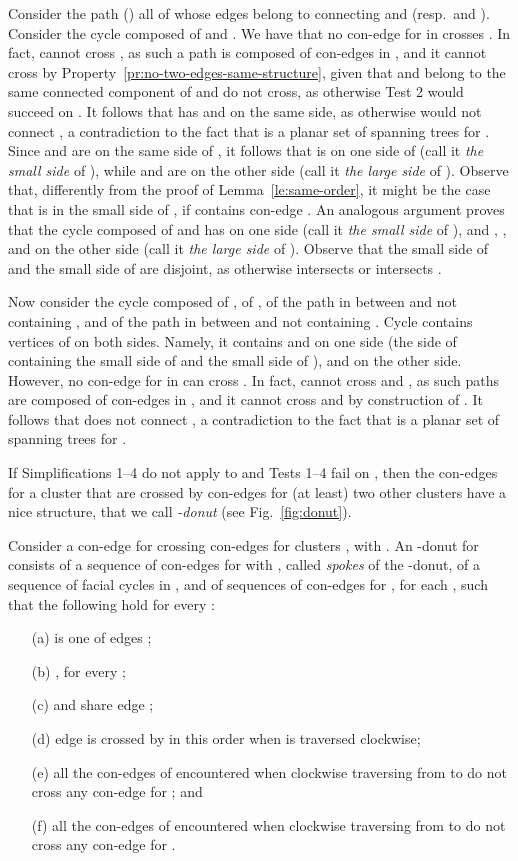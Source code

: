 \documentclass[letter,runningheads]{llncs}
\renewenvironment{proof}
{{\em Proof.\ }}{\hspace*{\fill}\par\vspace{2mm}}
\begin{document}
\begin{proof}
Consider the path  () all of whose edges belong to  connecting  and  (resp.\  and ).
Consider the cycle  composed of  and . We have that no con-edge  for  in  crosses . In fact,  cannot cross , as such a path is composed of con-edges in , and it cannot cross  by Property~\ref{pr:no-two-edges-same-structure}, given that  and  belong to the same connected component of  and do not cross, as otherwise {\sc Test 2} would succeed on . It follows that  has  and  on the same side, as otherwise  would not connect , a contradiction to the fact that  is a planar set of spanning trees for .  Since  and  are on the same side of , it follows that  is on one side of  (call it {\em the small side} of ), while  and  are on the other side (call it {\em the large side} of ). Observe that, differently from the proof of Lemma~\ref{le:same-order}, it might be the case that  is in the small side of , if  contains con-edge .
An analogous argument proves that the cycle  composed of  and  has  on one side (call it {\em the small side} of ), and , , and  on the other side (call it {\em the large side} of ).
Observe that the small side of  and the small side of  are disjoint, as otherwise  intersects  or  intersects .

Now consider the cycle  composed of , of , of the path  in  between  and  not containing , and of the path  in  between  and  not containing . Cycle  contains vertices of  on both sides. Namely, it contains  and  on one side (the side of  containing the small side of  and the small side of ), and  on the other side. However, no con-edge  for  in  can cross . In fact,  cannot cross  and , as such paths are composed of con-edges in , and it cannot cross  and  by construction of . It follows that  does not connect , a contradiction to the fact that  is a planar set of spanning trees for .
\end{proof}


If {\sc Simplifications 1--4} do not apply to  and {\sc Tests 1--4} fail on , then the con-edges for a cluster  that are crossed by con-edges for (at least) two other clusters have a nice structure, that we call {\em -donut} (see Fig.~\ref{fig:donut}). 

Consider a con-edge  for  crossing con-edges  for clusters , with . An -donut for  consists of a sequence  of con-edges for  with , called {\em spokes} of the -donut, of a sequence  of facial cycles in , and of sequences  of con-edges for , for each , such that the following hold for every : 

\begin{itemize}
\item[(a)]  is one of edges ;
\item[(b)] , for every ;
\item[(c)]  and  share edge ;
\item[(d)] edge  is crossed by  in this order when  is traversed clockwise;
\item[(e)] all the con-edges of  encountered when clockwise traversing  from  to  do not cross any con-edge for ; and
\item[(f)] all the con-edges of  encountered when clockwise traversing  from  to  do not cross any con-edge for . 
\end{itemize}
\end{document}
